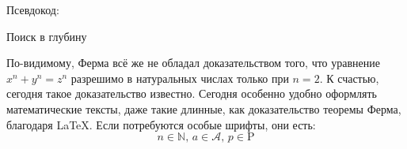 Псевдокод:
\begin{algorithm}\caption{Поиск в глубину}
\DontPrintSemicolon
{}
\end{algorithm}


По-видимому, Ферма всё же не обладал доказательством того, что уравнение $x^n+y^n=z^n$ разрешимо в натуральных числах только при $n=2$. К счастью, сегодня такое доказательство известно. Сегодня особенно удобно оформлять математические тексты, даже такие длинные, как доказательство теоремы Ферма, благодаря \LaTeX. Если потребуются особые шрифты, они есть:
\[ n\in\mathbb{N},\,a\in\mathcal{A},\, p\in\mathrm{P} \]